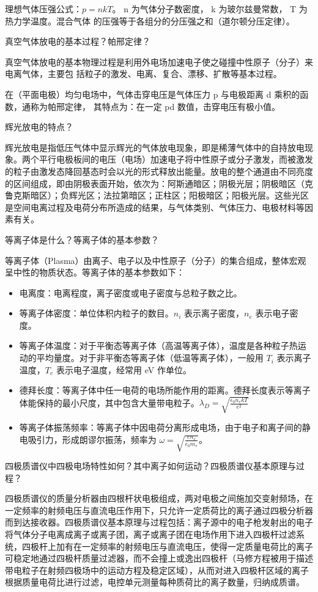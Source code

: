 \documentclass[dvipsnames, svgnames,a4paper,11pt]{article}
\begin{document}
理想气体压强公式：$ p = nkT$。 n 为气体分子数密度， k 为玻尔兹曼常数， T 为热力学温度。混合气体
的压强等于各组分的分压强之和（道尔顿分压定律）。
\begin{question}
	真空气体放电的基本过程？帕邢定律？
\end{question}
真空气体放电的基本物理过程是利用外电场加速电子使之碰撞中性原子（分子）来电离气体，主要包
括粒子的激发、电离、复合、漂移、扩散等基本过程。

在（平面电极）均匀电场中，气体击穿电压是气体压力 p 与电极距离 d 乘积的函数，通称为帕邢定律，
其特点为：在一定 pd 数值，击穿电压有极小值。
\begin{question}
	辉光放电的特点？
	\end{question}
	辉光放电是指低压气体中显示辉光的气体放电现象，即是稀薄气体中的自持放电现象。两个平行电极板间的电压（电场）加速电子将中性原子或分子激发，而被激发的粒子由激发态降回基态时会以光的形式释放出能量。放电的整个通道由不同亮度的区间组成，即由阴极表面开始，依次为：阿斯通暗区；阴极光层；阴极暗区（克鲁克斯暗区）；负辉光区；法拉第暗区；正柱区；阳极暗区；阳极光层。这些光区是空间电离过程及电荷分布所造成的结果，与气体类别、气体压力、电极材料等因素有关。
	
	\begin{question}
	等离子体是什么？等离子体的基本参数？
	\end{question}
	等离子体（Plasma）由离子、电子以及中性原子（分子）的集合组成，整体宏观呈中性的物质状态。等离子体的基本参数如下：
	\begin{itemize}
		\item 电离度：电离程度，离子密度或电子密度与总粒子数之比。
		\item 等离子体密度：单位体积内粒子的数目。$n_i$ 表示离子密度，$n_e$ 表示电子密度。
		\item 等离子体温度：对于平衡态等离子体（高温等离子体），温度是各种粒子热运动的平均量度。对于非平衡态等离子体（低温等离子体），一般用 $T_i$ 表示离子温度，$T_e$ 表示电子温度，经常用 eV 作单位。
		\item 德拜长度：等离子体中任一电荷的电场所能作用的距离。德拜长度表示等离子体能保持的最小尺度，其中包含大量带电粒子。$\lambda_D = \sqrt{\frac{\epsilon_0 n_e k T}{e^2}}$
		\item 等离子体振荡频率：等离子体中因电荷分离形成电场，由于电子和离子间的静电吸引力，形成朗谬尔振荡，频率为 $\omega = \sqrt{\frac{e n_e}{\epsilon_0 m_e}}$。
	\end{itemize}
	
	\begin{question}
	四极质谱仪中四极电场特性如何？其中离子如何运动？四极质谱仪基本原理与过程？
	\end{question}
	四极质谱仪的质量分析器由四根杆状电极组成，两对电极之间施加交变射频场，在一定频率的射频电压与直流电压作用下，只允许一定质荷比的离子通过四极分析器而到达接收器。四极质谱仪基本原理与过程包括：离子源中的电子枪发射出的电子将气体分子电离成离子或离子团，离子或离子团在电场作用下进入四极杆过滤系统，四极杆上加有在一定频率的射频电压与直流电压，使得一定质量电荷比的离子可稳定地通过四极杆质量过滤器，而不会撞上或逸出四极杆（马修方程被用于描述带电粒子在射频四极场中的运动方程及稳定区域），从而对进入四极杆区域的离子根据质量电荷比进行过滤，电控单元测量每种质荷比的离子数量，归纳成质谱。
	
\end{document}
